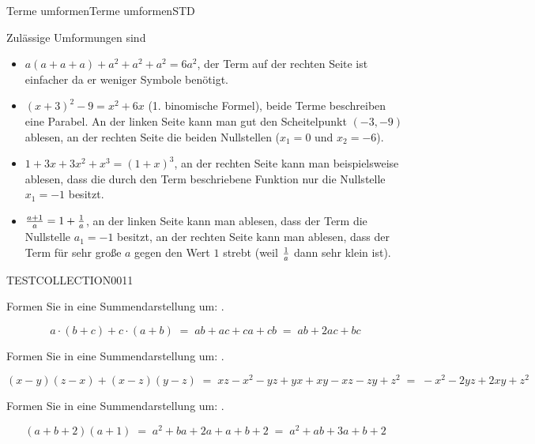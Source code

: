 \begin{MXContent}{Terme umformen}{Terme umformen}{STD}
\begin{MExample}
Zulässige Umformungen sind
\begin{itemize}
\item{$a(a+a+a)+a^2+a^2+a^2 = 6a^2$, der Term auf der rechten Seite ist einfacher da er weniger Symbole benötigt.} %
\item{$(x+3)^2-9=x^2+6x$ (1. binomische Formel), beide Terme beschreiben eine Parabel. An der linken Seite kann man gut
den Scheitelpunkt $(-3,-9)$ ablesen, an der rechten Seite die beiden Nullstellen ($x_1=0$ und $x_2=-6$).}
\item{$1+3x+3x^2+x^3=(1+x)^3$, an der rechten Seite kann man beispielsweise ablesen, dass die durch den Term beschriebene Funktion
nur die Nullstelle $x_1=-1$ besitzt.}
\item{$\tfrac{a+1}{a}=1+\tfrac{1}{a}$, an der linken Seite kann man ablesen, dass der Term die Nullstelle $a_1=-1$ besitzt, an der rechten
Seite kann man ablesen, dass der Term für sehr große $a$ gegen den Wert $1$ strebt (weil $\tfrac{1}{a}$ dann sehr klein ist).}
\end{itemize}
\end{MExample}


\begin{MExerciseCollection}{TESTCOLLECTION001}{1}

\begin{MExercise}
Formen Sie in eine Summendarstellung um: .
\begin{MHint}{\iSolution}
$$
a\cdot(b+c)+c\cdot(a+b) \;=\; a b + a c + c a + c b \;=\; a b + 2 a c + b c
$$
\end{MHint}
\end{MExercise}

\begin{MExercise}
Formen Sie in eine Summendarstellung um: .
\begin{MHint}{\iSolution}
$$
(x-y)(z-x)+(x-z)(y-z) \;=\; x z - x^2 -y z +y x + x y - x z - z y + z^2 \;=\; -x^2 - 2 y z + 2 x y + z^2 %
$$
\end{MHint}
\end{MExercise}

\begin{MExercise}
Formen Sie in eine Summendarstellung um: .
\begin{MHint}{\iSolution}
$$
(a+b+2)(a+1) \;=\; a^2 + b a + 2a + a + b + 2 \;=\; a^2 + a b + 3a + b +2
$$
\end{MHint}
\end{MExercise}

\end{MExerciseCollection}




\end{MXContent}


